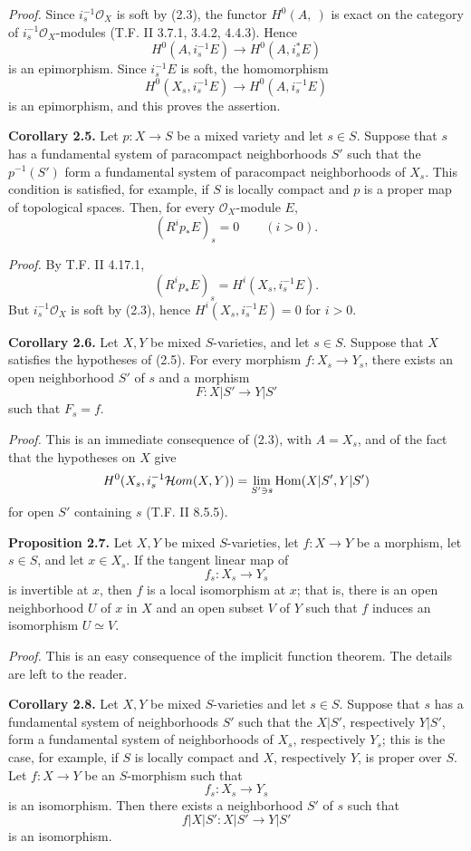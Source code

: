 \documentclass[11pt]{article}
\begin{document}
\emph{Proof.} Since $i_s^{-1}\mathcal O_X$ is soft by (2.3), the functor $H^0(A,\ )$ is exact on the category of $i_s^{-1}\mathcal O_X$-modules (T.F. II 3.7.1, 3.4.2, 4.4.3). Hence
\[
 H^0(A,i_s^{-1}E)\longrightarrow H^0(A,i_s^*E)
\]
is an epimorphism. Since $i_s^{-1}E$ is soft, the homomorphism
\[
 H^0(X_s,i_s^{-1}E)\longrightarrow H^0(A,i_s^{-1}E)
\]
is an epimorphism, and this proves the assertion.

\textbf{Corollary 2.5.} Let $p:X\to S$ be a mixed variety and let $s\in S$. Suppose that $s$ has a fundamental system of paracompact neighborhoods $S'$ such that the $p^{-1}(S')$ form a fundamental system of paracompact neighborhoods of $X_s$. This condition is satisfied, for example, if $S$ is locally compact and $p$ is a proper map of topological spaces. Then, for every $\mathcal O_X$-module $E$,
\[
 (R^ip_*E)_s=0\qquad(i>0).
\]

\emph{Proof.} By T.F. II 4.17.1,
\[
 (R^ip_*E)_s=H^i(X_s,i_s^{-1}E).
\]
But $i_s^{-1}\mathcal O_X$ is soft by (2.3), hence $H^i(X_s,i_s^{-1}E)=0$ for $i>0$.

\textbf{Corollary 2.6.} Let $X,Y$ be mixed $S$-varieties, and let $s\in S$. Suppose that $X$ satisfies the hypotheses of (2.5). For every morphism $f:X_s\to Y_s$, there exists an open neighborhood $S'$ of $s$ and a morphism
\[
 F:X|S'\longrightarrow Y|S'
\]
such that $F_s=f$.

\emph{Proof.} This is an immediate consequence of (2.3), with $A=X_s$, and of the fact that the hypotheses on $X$ give
\[
 H^0(X_s,i_s^{-1}\mathcal Hom(X,Y))
 =\operatorname*{lim}_{S'\ni s}\operatorname{Hom}(X|S',Y|S')
\]
for open $S'$ containing $s$ (T.F. II 8.5.5).

\textbf{Proposition 2.7.} Let $X,Y$ be mixed $S$-varieties, let $f:X\to Y$ be a morphism, let $s\in S$, and let $x\in X_s$. If the tangent linear map of
\[
 f_s:X_s\longrightarrow Y_s
\]
is invertible at $x$, then $f$ is a local isomorphism at $x$; that is, there is an open neighborhood $U$ of $x$ in $X$ and an open subset $V$ of $Y$ such that $f$ induces an isomorphism $U\simeq V$.

\emph{Proof.} This is an easy consequence of the implicit function theorem. The details are left to the reader.

\textbf{Corollary 2.8.} Let $X,Y$ be mixed $S$-varieties and let $s\in S$. Suppose that $s$ has a fundamental system of neighborhoods $S'$ such that the $X|S'$, respectively $Y|S'$, form a fundamental system of neighborhoods of $X_s$, respectively $Y_s$; this is the case, for example, if $S$ is locally compact and $X$, respectively $Y$, is proper over $S$. Let $f:X\to Y$ be an $S$-morphism such that
\[
 f_s:X_s\longrightarrow Y_s
\]
is an isomorphism. Then there exists a neighborhood $S'$ of $s$ such that
\[
 f|X|S':X|S'\longrightarrow Y|S'
\]
is an isomorphism.
\end{document}
